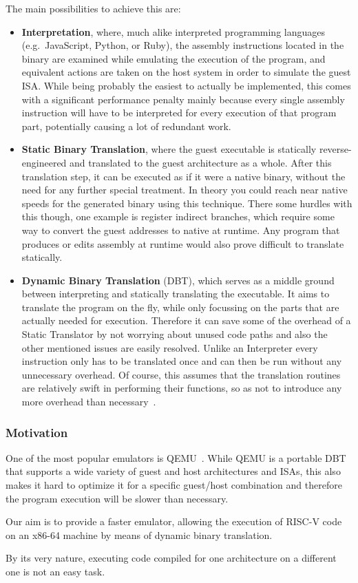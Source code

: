 The main possibilities to achieve this are:
\begin{itemize}
    \item \textbf{Interpretation}, where, much alike interpreted programming languages (e.g.\ JavaScript, Python, or Ruby), the assembly instructions located in the binary are examined while emulating the execution of the program, and equivalent actions are taken on the host system in order to simulate the guest ISA\@.
        \subitem While being probably the easiest to actually be implemented, this comes with a significant performance penalty mainly because every single assembly instruction will have to be interpreted for every execution of that program part, potentially causing a lot of redundant work.
    \item \textbf{Static Binary Translation}, where the guest executable is statically reverse-engineered and translated to the guest architecture as a whole.
    After this translation step, it can be executed as if it were a native binary, without the need for any further special treatment.
    In theory you could reach near native speeds for the generated binary using this technique.
    There some hurdles with this though, one example is register indirect branches, which require some way to convert the guest addresses to native at runtime.
    Any program that produces or edits assembly at runtime would also prove difficult to translate statically.
    \item \textbf{Dynamic Binary Translation} (DBT), which serves as a middle ground between interpreting and statically translating the executable.
    It aims to translate the program on the fly, while only focussing on the parts that are actually needed for execution.
    Therefore it can save some of the overhead of a Static Translator by not worrying about unused code paths and also the other mentioned issues are easily resolved.
    Unlike an Interpreter every instruction only has to be translated once and can then be run without any unnecessary overhead.
    Of course, this assumes that the translation routines are relatively swift in performing their functions, so as not to introduce any more overhead than necessary~\cite[S. 1f.]{bintrans}.
\end{itemize}

\subsubsection{Motivation}
One of the most popular emulators is QEMU~\cite{bellard2005qemu}\@.
While QEMU is a portable DBT that supports a wide variety of guest and host architectures and ISAs, this also makes it hard to optimize it for a specific guest/host combination and therefore the program execution will be slower than necessary.

Our aim is to provide a faster emulator, allowing the execution of RISC-V code on an x86-64 machine by means of dynamic binary translation.

By its very nature, executing code compiled for one architecture on a different one is not an easy task.















